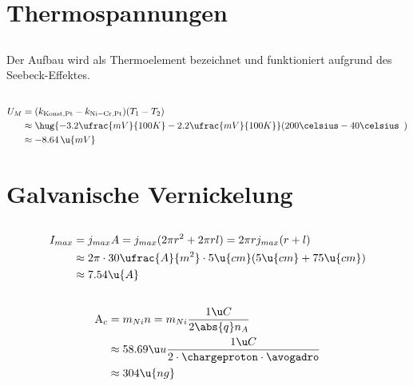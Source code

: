 \documentclass[11pt]{article}
\begin{document}
\section{Thermospannungen}
\subsection{}
\begin{adjustwidth}{20pt}{}
    Der Aufbau wird als Thermoelement bezeichnet und funktioniert
    aufgrund des Seebeck-Effektes.
\end{adjustwidth}

\subsection{}
\begin{align*}
    U_M &= (k_{\mathrm{Konst},\mathrm{Pt}} - k_{\mathrm{Ni-Cr},\mathrm{Pt}})(T_1-T_2)\\
    &\approx \hug{-3.2 \ufrac{mV}{100K} - 2.2 \ufrac{mV}{100K}} (200\celsius - 40\celsius\ \, )\\
    &\approx -8.64 \, \u{mV} 
\end{align*}

\section{Galvanische Vernickelung}
\subsection{}
\begin{align*}
    I_{max} &= j_{max}A = j_{max}(2\pi r^2 + 2\pi r l) = 2 \pi r j_{max}(r + l)\\
    &\approx 2\pi \cdot 30\ufrac{A}{m^2} \cdot 5\u{cm}(5\u{cm} + 75\u{cm})\\
    &\approx 7.54\u{A}
\end{align*}

\subsection{}
\begin{align*}
    {\mathrm A_c} &= m_{Ni}n = m_{Ni} \frac{1\u C}{2 \abs{q} n_A}\\
    &\approx 58.69\u u \frac{1 \u C}{2 \cdot \chargeproton \cdot \avogadro}\\
    &\approx 304 \u {n g}\\
\end{align*}
\end{document}
